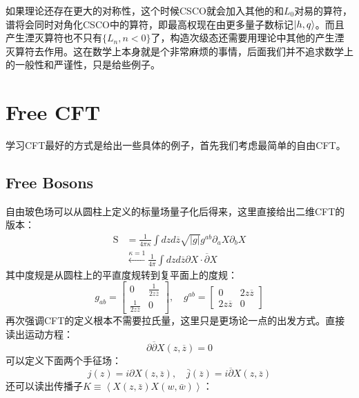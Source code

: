 如果理论还存在更大的对称性，这个时候CSCO就会加入其他的和${L_0}$对易的算符，谱将会同时对角化CSCO中的算符，即最高权现在由更多量子数标记$\ket{h,q}$。而且产生湮灭算符也不只有$\{L_{n},n<0\}$了，构造次级态还需要用理论中其他的产生湮灭算符去作用。这在数学上本身就是个非常麻烦的事情，后面我们并不追求数学上的一般性和严谨性，只是给些例子。

\section{Free CFT}
学习CFT最好的方式是给出一些具体的例子，首先我们考虑最简单的自由CFT。
\subsection{Free Bosons}
自由玻色场可以从圆柱上定义的标量场量子化后得来，这里直接给出二维CFT的版本：
\begin{equation}
	\begin{aligned}
		\text{S}& =\frac1{4\pi\kappa}\int dzd\overline{z}\sqrt{|g|}g^{ab}\partial_aX\partial_bX  \\
		&\xleftarrow{\kappa=1}\frac1{4\pi}\int dzd\overline{z}\partial X\cdot\overline{\partial}X
	\end{aligned}
\end{equation}
其中度规是从圆柱上的平直度规转到复平面上的度规：
\begin{equation}
	\left.g_{ab}=\left[\begin{array}{cc}0&\frac{1}{2z\overline{z}}\\\frac{1}{2z\overline{z}}&0\end{array}\right.\right],\quad g^{ab}=\left[\begin{array}{cc}0&2z\overline{z}\\2z\overline{z}&0\end{array}\right]
\end{equation}
再次强调CFT的定义根本不需要拉氏量，这里只是更场论一点的出发方式。直接读出运动方程：
\begin{equation}
	\partial\overline{\partial}X(z,\overline{z})=0
\end{equation}
可以定义下面两个手征场：
\begin{equation}\label{35.4}
	j(z)=i\partial X(z,\overline z),\quad\bar j(\overline z)=i\overline\partial X(z,\overline z)
\end{equation}
还可以读出传播子$K\equiv\left\langle{X(z,\bar z)X(w,\bar w)}\right\rangle$：
